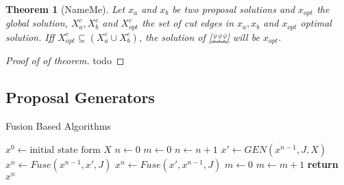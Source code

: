 \documentclass[10pt,twocolumn,letterpaper]{article}
\newtheorem{theorem}{Theorem}
\begin{document}
\begin{theorem}[NameMe]

Let $x_{a}$ and $x_{b}$ be two proposal solutions and  $x_{opt}$ the global solution,
$X_{a}^c, X_{b}^c$ and $ X_{opt}^c$ the set of cut edges in  $x_{a}, x_{b}$  and $ x_{opt}$
optimal solution.
Iff  $ X_{opt}^c \subseteq  (X_{a}^c \cup X_{b}^c)$,  the solution of \ref{???} will be $x_{opt}$.
\end{theorem}

\begin{proof}[Proof of of theorem]
todo
\end{proof}








\subsection{Proposal Generators}


\begin{algorithm}
\begin{scriptsize}
\caption{Fusion Based Algorithms}\label{alg:fusion}
\begin{algorithmic}[1]
\State $x^0 \gets \textrm{initial state form } X$
\State $n \gets 0 $                                 
\State $m \gets 0 $                                 
\State $n \gets n+1$ 
 \State $x'\gets GEN(x^{n-1},J,X)$                    
   \State $x^{n} \gets Fuse(x^{n-1},x',J)$             
 \Else
   \State $x^{n} \gets Fuse(x',x^{n-1},J)$
 \EndIf
   \State $m \gets 0$                                 
 \Else
   \State $m \gets m+1$                               
 \EndIf
\EndWhile
\State \textbf{return} $x^n$
\EndProcedure
\end{algorithmic}
\end{scriptsize}
\end{algorithm}
\end{document}

